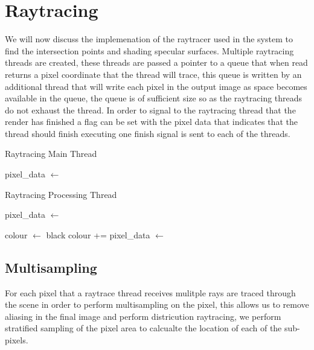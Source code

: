 \section{Raytracing}
We will now discuss the implemenation of the raytracer used in the system to find the intersection points and shading specular
surfaces. Multiple raytracing threads are created, these threads are passed a pointer to a queue that when read returns a
pixel coordinate that the thread will trace, this queue is written by an additional thread that will write each pixel in the
output image as space becomes available in the queue, the queue is of sufficient size so as the raytracing threads do not
exhaust the thread. In order to signal to the raytracing thread that the render has finished a flag can be set with the pixel
data that indicates that the thread should finish executing one finish signal is sent to each of the threads.

\begin{algorithm}
\begin{algorithmic}
\caption{Raytracing Main Thread}
	\State {}
\EndFor

	\State pixel\_data $\gets$ 
	\State {}
\EndFor

\end{algorithmic}
\end{algorithm}

\begin{algorithm}
\begin{algorithmic}
\caption{Raytracing Processing Thread}

\State pixel\_data  $\gets$ 

	\State colour $\gets$ black
		\State colour += 
	\EndFor
	\State {}
	\State pixel\_data  $\gets$ 
\EndWhile

\end{algorithmic}
\end{algorithm}

\subsection{Multisampling}
For each pixel that a raytrace thread receives mulitple rays are traced through the scene in order to perform multisampling
on the pixel, this allows us to remove aliasing in the final image and perform districution raytracing, we perform stratified
sampling of the pixel area to calcualte the location of each of the sub-pixels.

